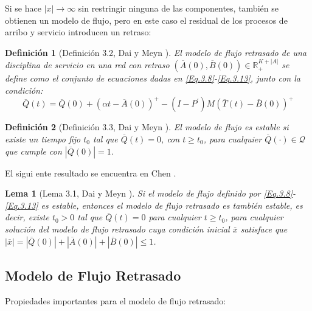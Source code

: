 \documentclass{article}
\newtheorem{Def}{Definición}[section]
\newtheorem{Lemma}{Lema}[section]
\newcommand{\rea}{\mathbb{R}}
\numberwithin{equation}{section}
\begin{document}
Si se hace $|x|\rightarrow\infty$ sin restringir ninguna de las
componentes, tambi\'en se obtienen un modelo de flujo, pero en
este caso el residual de los procesos de arribo y servicio
introducen un retraso:

\begin{Def}[Definici\'on 3.2, Dai y Meyn \cite{DaiSean}]
El modelo de flujo retrasado de una disciplina de servicio en una
red con retraso
$\left(\overline{A}\left(0\right),\overline{B}\left(0\right)\right)\in\rea_{+}^{K+|A|}$
se define como el conjunto de ecuaciones dadas en
\ref{Eq.3.8}-\ref{Eq.3.13}, junto con la condici\'on:
\begin{equation}\label{CondAd.FluidModel}
\overline{Q}\left(t\right)=\overline{Q}\left(0\right)+\left(\alpha
t-\overline{A}\left(0\right)\right)^{+}-\left(I-P^{'}\right)M\left(\overline{T}\left(t\right)-\overline{B}\left(0\right)\right)^{+}
\end{equation}
\end{Def}

\begin{Def}[Definici\'on 3.3, Dai y Meyn \cite{DaiSean}]
El modelo de flujo es estable si existe un tiempo fijo $t_{0}$ tal
que $\overline{Q}\left(t\right)=0$, con $t\geq t_{0}$, para
cualquier $\overline{Q}\left(\cdot\right)\in\mathcal{Q}$ que
cumple con $|\overline{Q}\left(0\right)|=1$.
\end{Def}

El sigui	ente resultado se encuentra en Chen \cite{Chen}.
\begin{Lemma}[Lema 3.1, Dai y Meyn \cite{DaiSean}]
Si el modelo de flujo definido por \ref{Eq.3.8}-\ref{Eq.3.13} es
estable, entonces el modelo de flujo retrasado es tambi\'en
estable, es decir, existe $t_{0}>0$ tal que
$\overline{Q}\left(t\right)=0$ para cualquier $t\geq t_{0}$, para
cualquier soluci\'on del modelo de flujo retrasado cuya
condici\'on inicial $\overline{x}$ satisface que
$|\overline{x}|=|\overline{Q}\left(0\right)|+|\overline{A}\left(0\right)|+|\overline{B}\left(0\right)|\leq1$.
\end{Lemma}


\subsection{Modelo de Flujo Retrasado}\label{ModeloFlujoIntro}

Propiedades importantes para el modelo de flujo retrasado:
\end{document}
